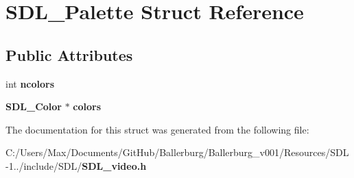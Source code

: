 \section{S\+D\+L\+\_\+\+Palette Struct Reference}
\label{struct_s_d_l___palette}
\subsection*{Public Attributes}
\begin{DoxyCompactItemize}
\item 
int {\bfseries ncolors}\label{struct_s_d_l___palette_a81a0cc3197480e994c6b06f1f0567091}

\item 
{\bf S\+D\+L\+\_\+\+Color} $\ast$ {\bfseries colors}\label{struct_s_d_l___palette_ad757a50037f43533196e94942440b241}

\end{DoxyCompactItemize}


The documentation for this struct was generated from the following file\+:\begin{DoxyCompactItemize}
\item 
C\+:/\+Users/\+Max/\+Documents/\+Git\+Hub/\+Ballerburg/\+Ballerburg\+\_\+v001/\+Resources/\+S\+D\+L-\/1../include/\+S\+D\+L/{\bf S\+D\+L\+\_\+video.\+h}\end{DoxyCompactItemize}
